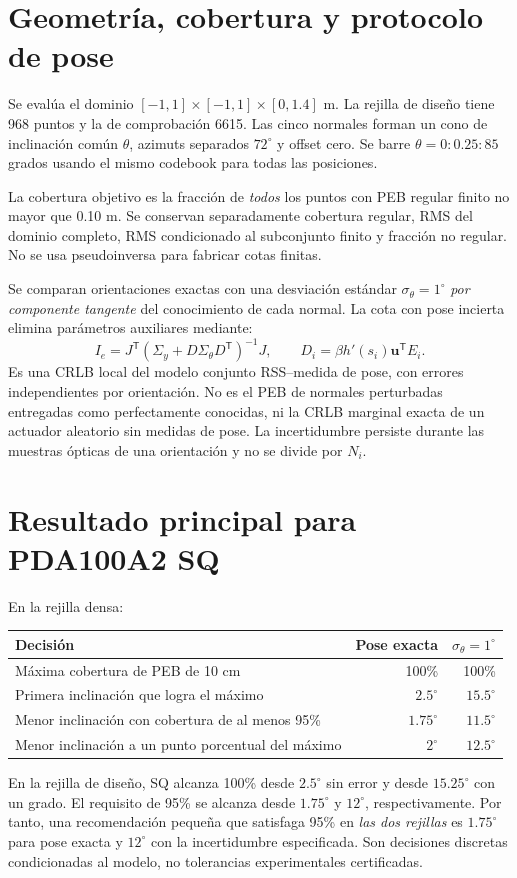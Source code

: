 \documentclass[11pt,a4paper]{article}
\begin{document}
\section{Geometría, cobertura y protocolo de pose}
Se evalúa el dominio $[-1,1]\times[-1,1]\times[0,1.4]$ m. La rejilla de diseño tiene 968 puntos y la de comprobación 6615. Las cinco normales forman un cono de inclinación común $\theta$, azimuts separados $72^\circ$ y offset cero. Se barre $\theta=0:0.25:85$ grados usando el mismo codebook para todas las posiciones.

La cobertura objetivo es la fracción de \emph{todos} los puntos con PEB regular finito no mayor que 0.10 m. Se conservan separadamente cobertura regular, RMS del dominio completo, RMS condicionado al subconjunto finito y fracción no regular. No se usa pseudoinversa para fabricar cotas finitas.

Se comparan orientaciones exactas con una desviación estándar $\sigma_\theta=1^\circ$ \emph{por componente tangente} del conocimiento de cada normal. La cota con pose incierta elimina parámetros auxiliares mediante:
\begin{equation}
 I_e=J^{\mathsf T}(\Sigma_y+D\Sigma_\theta D^{\mathsf T})^{-1}J,\qquad
 D_i=\beta h'(s_i)\mathbf u^{\mathsf T}E_i.
\end{equation}
Es una CRLB local del modelo conjunto RSS--medida de pose, con errores independientes por orientación. No es el PEB de normales perturbadas entregadas como perfectamente conocidas, ni la CRLB marginal exacta de un actuador aleatorio sin medidas de pose. La incertidumbre persiste durante las muestras ópticas de una orientación y no se divide por $N_i$.

\section{Resultado principal para PDA100A2 SQ}
En la rejilla densa:
\begin{center}
\begin{tabular}{lrr}
\toprule Decisión & Pose exacta & $\sigma_\theta=1^\circ$ \\
\midrule
Máxima cobertura de PEB de 10 cm & 100\% & 100\% \\
Primera inclinación que logra el máximo & $2.5^\circ$ & $15.5^\circ$ \\
Menor inclinación con cobertura de al menos 95\% & $1.75^\circ$ & $11.5^\circ$ \\
Menor inclinación a un punto porcentual del máximo & $2^\circ$ & $12.5^\circ$ \\
\bottomrule
\end{tabular}
\end{center}
En la rejilla de diseño, SQ alcanza 100\% desde $2.5^\circ$ sin error y desde $15.25^\circ$ con un grado. El requisito de 95\% se alcanza desde $1.75^\circ$ y $12^\circ$, respectivamente. Por tanto, una recomendación pequeña que satisfaga 95\% en \emph{las dos rejillas} es $1.75^\circ$ para pose exacta y $12^\circ$ con la incertidumbre especificada. Son decisiones discretas condicionadas al modelo, no tolerancias experimentales certificadas.
\end{document}
